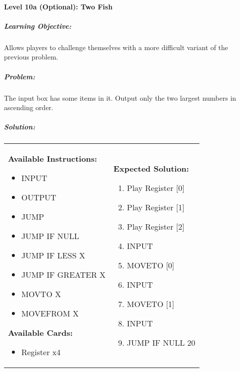 \paragraph{Level 10a (Optional): Two Fish}
\subparagraph{Learning Objective:} Allows players to challenge themselves with a 
more difficult variant of the previous problem.

\subparagraph{Problem:} The input box has some items in it. Output only the two 
largest numbers in ascending order.

\newpage
\subparagraph{Solution:} 
\begin{center}
    \begin{tabular}{ | m{5cm} | m{9cm} | } 
        \hline
            \textbf{Available Instructions:} 
            \begin{itemize}
                \setlength\itemsep{-.35em}
                \item INPUT
                \item OUTPUT
                \item JUMP
                \item JUMP IF NULL
                \item JUMP IF LESS X
                \item JUMP IF GREATER X
                \item MOVTO X
                \item MOVEFROM X
            \end{itemize}
            \textbf{Available Cards:} 
            \begin{itemize}
                \setlength\itemsep{-.35em}
                \item Register x4
            \end{itemize}& 
            \textbf{Expected Solution:} 
            \begin{enumerate}
                \setlength\itemsep{-.35em}
                \item Play Register [0]
                \item Play Register [1]
                \item Play Register [2]
                \item INPUT
                \item MOVETO [0]
                \item INPUT
                \item MOVETO [1]
                \item INPUT
                \item JUMP IF NULL 20

\end{enumerate}
\end{tabular}
\end{center}
